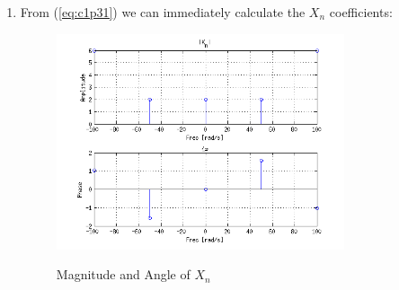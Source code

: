 \begin{enumerate}
\item 
From (\ref{eq:c1p31}) we can immediately calculate the $X_n$ coefficients:

\begin{figure}[H]
\caption{Magnitude and Angle of $X_n$}
\centering
\includegraphics[width=0.8\textwidth]{figs/c1p3a.png}
\label{fig:c1p3a}
\end{figure} 

\end{enumerate} 
